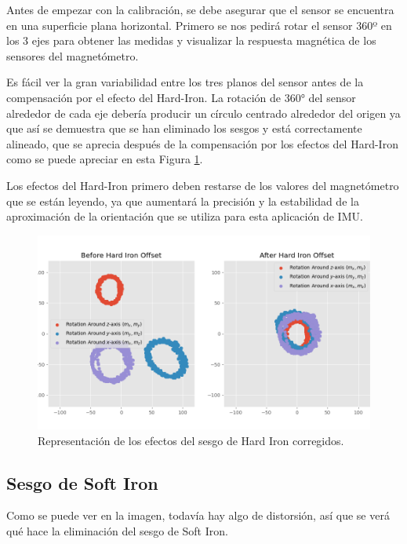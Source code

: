 Antes de empezar con la calibración, se debe asegurar que el sensor se encuentra en una superficie plana horizontal. Primero se nos pedirá rotar el sensor 360º en los 3 ejes para obtener las medidas y visualizar la respuesta magnética de los sensores del magnetómetro.

Es fácil ver la gran variabilidad entre los tres planos del sensor antes de la compensación por el efecto del Hard-Iron. La rotación de 360° del sensor alrededor de cada eje debería producir un círculo centrado alrededor del origen ya que así se demuestra que se han eliminado los sesgos y está correctamente alineado, que se aprecia después de la compensación por los efectos del Hard-Iron como se puede apreciar en esta Figura \ref{fig:hardiron}.

Los efectos del Hard-Iron primero deben restarse de los valores del magnetómetro que se están leyendo, ya que aumentará la precisión y la estabilidad de la aproximación de la orientación que se utiliza para esta aplicación de IMU.

\begin{figure}[H]
  \centering
  \includegraphics[scale=0.6]{figs/hard_iron_calibration} %
  \caption{ Representación de los efectos del sesgo de Hard Iron corregidos.}
  \label{fig:hardiron}
\end{figure} 

\subsection{Sesgo de Soft Iron}
\label{subsec:soft_iron}

Como se puede ver en la imagen, todavía hay algo de distorsión, así que se verá qué hace la eliminación del sesgo de Soft Iron.

